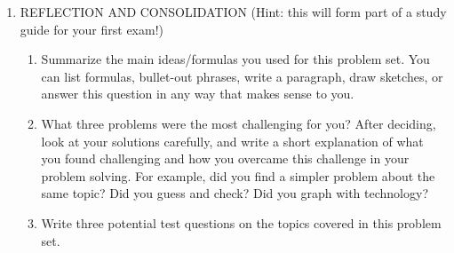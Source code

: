 \documentclass[12pt]{amsart}
\begin{document}
\begin{enumerate}
\item REFLECTION AND CONSOLIDATION (Hint: this will form part of a study guide for your first exam!)
\begin{enumerate}
\item Summarize the main ideas/formulas you used for this problem set.  You can list formulas, bullet-out phrases, write a paragraph, draw sketches, or answer this question in any way that makes sense to you.
\item What three problems were the most challenging for you?  After deciding, look at your solutions carefully, and write a short explanation of what you found challenging and how you overcame this challenge in your problem solving.  For example, did you find a simpler problem about the same topic?  Did you guess and check?  Did you graph with technology?
\item Write three potential test questions on the topics covered in this problem set.
\end{enumerate}
      

\end{enumerate}
\end{document}
